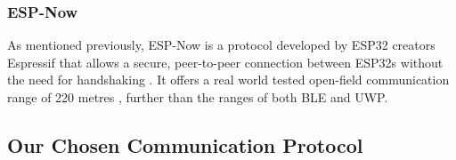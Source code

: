 {

\subsubsection{ESP-Now}

As mentioned previously, ESP-Now is a protocol developed by ESP32 creators Espressif that allows a secure, peer-to-peer connection between ESP32s without the need for handshaking \cite{esp-now_overview}. It offers a real world tested open-field communication range of 220 metres \cite{random_nerd_tutorials}, further than the ranges of both BLE and UWP.



\subsection{Our Chosen Communication Protocol}

}
